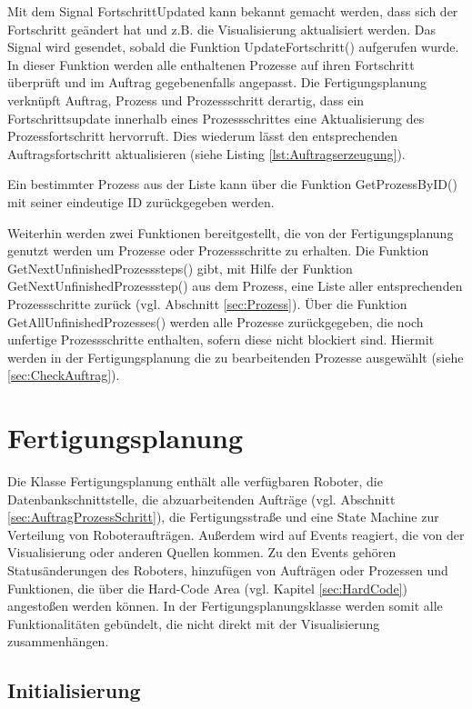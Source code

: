 Mit dem Signal FortschrittUpdated kann bekannt gemacht werden, dass sich der Fortschritt geändert hat und z.B. die Visualisierung aktualisiert werden. Das Signal wird gesendet, sobald die Funktion UpdateFortschritt() aufgerufen wurde. In dieser Funktion werden alle enthaltenen Prozesse auf ihren Fortschritt überprüft und im Auftrag gegebenenfalls angepasst. Die Fertigungsplanung verknüpft Auftrag, Prozess und Prozessschritt derartig, dass ein Fortschrittsupdate innerhalb eines Prozessschrittes eine Aktualisierung des Prozessfortschritt hervorruft. Dies wiederum lässt den entsprechenden Auftragsfortschritt aktualisieren (siehe Listing \ref{lst:Auftragserzeugung}).

Ein bestimmter Prozess aus der Liste kann über die Funktion GetProzessByID() mit seiner eindeutige ID zurückgegeben werden. 

Weiterhin werden zwei Funktionen bereitgestellt, die von der Fertigungsplanung genutzt werden um Prozesse oder Prozessschritte zu erhalten. Die Funktion GetNextUnfinishedProzesssteps() gibt, mit Hilfe der Funktion GetNextUnfinishedProzessstep() aus dem Prozess, eine Liste aller entsprechenden Prozessschritte zurück (vgl. Abschnitt \ref{sec:Prozess}). Über die Funktion GetAllUnfinishedProzesses() werden alle Prozesse zurückgegeben, die noch unfertige Prozessschritte enthalten, sofern diese nicht blockiert sind. Hiermit werden in der Fertigungsplanung die zu bearbeitenden Prozesse ausgewählt (siehe \ref{sec:CheckAuftrag}).

\section{Fertigungsplanung}
\label{sec:Fertigungsplanung}

Die Klasse Fertigungsplanung enthält alle verfügbaren Roboter, die Datenbankschnittstelle, die abzuarbeitenden Aufträge (vgl. Abschnitt \ref{sec:AuftragProzessSchritt}), die Fertigungsstraße und eine State Machine zur Verteilung von Roboteraufträgen. Außerdem wird auf Events reagiert, die von der Visualisierung oder anderen Quellen kommen. Zu den Events gehören Statusänderungen des Roboters, hinzufügen von Aufträgen oder Prozessen und Funktionen, die über die Hard-Code Area (vgl. Kapitel \ref{sec:HardCode}) angestoßen werden können. 
In der Fertigungsplanungsklasse werden somit alle Funktionalitäten gebündelt, die nicht direkt mit der Visualisierung zusammenhängen. 

\subsection{Initialisierung}
\label{sec:Fertigunginit}

